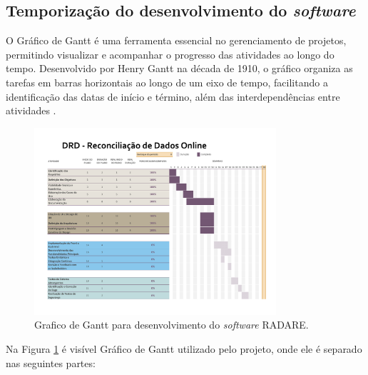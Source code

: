 \subsection{Temporização do desenvolvimento do \textit{software}}

O Gráfico de Gantt é uma ferramenta essencial no gerenciamento de projetos, permitindo visualizar e acompanhar o progresso das atividades ao longo do tempo. Desenvolvido por Henry Gantt na década de 1910, o gráfico organiza as tarefas em barras horizontais ao longo de um eixo de tempo, facilitando a identificação das datas de início e término, além das interdependências entre atividades \cite{ganttchart}.

\begin{figure}[htbp!]
    \centering
    \includegraphics[width=0.8\textwidth]{figuras/DRD-Ganttt.pdf} %
    \caption{Grafico de Gantt para desenvolvimento do \textit{software} RADARE.}
    \label{fig:ganttChart}
\end{figure}   

Na Figura \ref{fig:ganttChart} é visível Gráfico de Gantt utilizado pelo projeto, onde ele é separado nas seguintes partes: 
    
